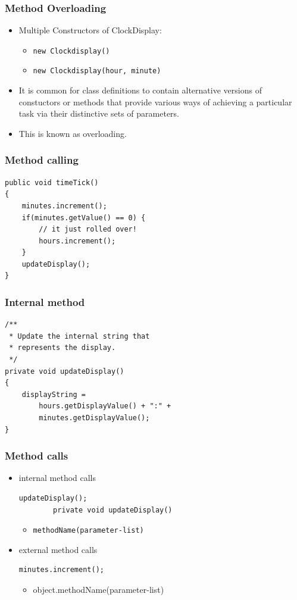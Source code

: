 \begin{frame}
\frametitle{Method Overloading}
\begin{itemize}
\item Multiple Constructors of ClockDisplay:
\begin{itemize}
\item \lstinline!new Clockdisplay()‏!
\item \lstinline!new Clockdisplay(hour, minute)‏!
\end{itemize}
\item It is common for class definitions to contain alternative versions of constuctors or methods that provide various ways of achieving a particular task via their distinctive sets of parameters.
\item This is known as \alert{overloading}.
\end{itemize}
\end{frame}

\begin{frame}[fragile]
\frametitle{Method calling}
\codelist
\begin{lstlisting}
public void timeTick()‏
{
    minutes.increment();
    if(minutes.getValue() == 0) { 
        // it just rolled over!
        hours.increment();
    }
    updateDisplay();
}
\end{lstlisting}
\end{frame}

\begin{frame}[fragile]
\frametitle{Internal method}
\codelist
\begin{lstlisting}
/**
 * Update the internal string that
 * represents the display.
 */
private void updateDisplay()‏
{
    displayString = 
        hours.getDisplayValue() + ":" + 
        minutes.getDisplayValue();
}
\end{lstlisting}
\end{frame}

\begin{frame}[fragile]
\frametitle{Method calls}
\begin{itemize}
\item internal method calls
\codelist
\begin{lstlisting}[linewidth=6cm]
		updateDisplay();
		private void updateDisplay()‏
\end{lstlisting}
\begin{itemize}
\item \lstinline!methodName(parameter-list)!		
\end{itemize}
\item external method calls
\codelist
\begin{lstlisting}[linewidth=6cm]
		minutes.increment();
\end{lstlisting}
\begin{itemize}
\item object.methodName(parameter-list)‏
\end{itemize}
\end{itemize}
\end{frame}

